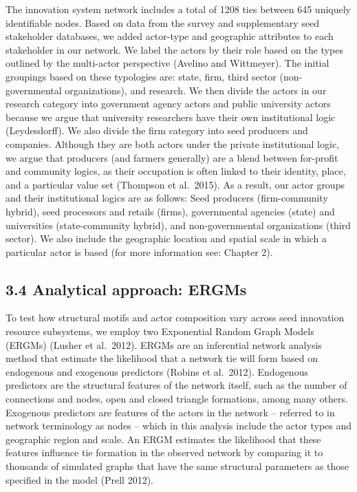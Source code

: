 \documentclass[twoside,12pt,final]{ucthesis-CA2012}
\begin{document}
\begin{ucmainmatter}
The innovation system network includes a total of 1208 ties between 645
uniquely identifiable nodes. Based on data from the survey and
supplementary seed stakeholder databases, we added actor-type and
geographic attributes to each stakeholder in our network. We label the
actors by their role based on the types outlined by the multi-actor
perspective (Avelino and Wittmeyer). The initial groupings based on
these typologies are: state, firm, third sector (non-governmental
organizations), and research. We then divide the actors in our research
category into government agency actors and public university actors
because we argue that university researchers have their own
institutional logic (Leydesdorff). We also divide the \textquotesingle firm\textquotesingle{} category
into seed producers and companies. Although they are both actors under
the private institutional logic, we argue that producers (and farmers
generally) are a blend between for-profit and community logics, as their
occupation is often linked to their identity, place, and a particular
value set (Thompson et al.~2015). As a result, our actor groups and
their institutional logics are as follows: Seed producers
(firm-community hybrid), seed processors and retails (firms),
governmental agencies (state) and universities (state-community hybrid),
and non-governmental organizations (third sector). We also include the
geographic location and spatial scale in which a particular actor is
based (for more information see: Chapter 2).

\hypertarget{analytical-approach-ergms}{%
\subsection{3.4 Analytical approach: ERGMs}\label{analytical-approach-ergms}}

To test how structural motifs and actor composition vary across seed
innovation resource subsystems, we employ two Exponential Random Graph
Models (ERGMs) (Lusher et al.~2012). ERGMs are an inferential network
analysis method that estimate the likelihood that a network tie will
form based on endogenous and exogenous predictors (Robins et al.~2012).
Endogenous predictors are the structural features of the network itself,
such as the number of connections and nodes, open and closed triangle
formations, among many others. Exogenous predictors are features of the
actors in the network -- referred to in network terminology as \textquotesingle nodes\textquotesingle{}
-- which in this analysis include the actor types and geographic region
and scale. An ERGM estimates the likelihood that these features
influence tie formation in the observed network by comparing it to
thousands of simulated graphs that have the same structural parameters
as those specified in the model (Prell 2012).


\end{ucmainmatter}
\end{document}
